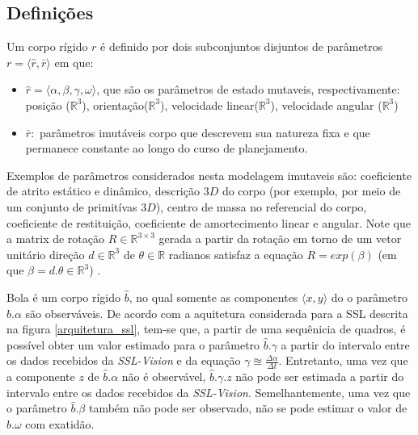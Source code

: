 \subsection{Definições}


\begin{defi}
  Um corpo rígido $r$ é definido por dois subconjuntos disjuntos
  de parâmetros $r= \langle \hat{r}, \bar{r} \rangle$ em que:
  \begin{itemize}
    \item $\hat{r} = \langle \alpha, \beta, \gamma, \omega \rangle$,
    que são os parâmetros de estado mutaveis, respectivamente:
    posição ($\mathbb{R} ^{3}$), orientação($\mathbb{R} ^{3}$),
    velocidade linear($\mathbb{R} ^{3}$), velocidade angular
    ($\mathbb{R} ^{3}$)

    \item $\bar{r} :$ parâmetros imutáveis corpo que descrevem sua
    natureza fixa e que permanece constante ao longo do curso de 
    planejamento.
  \end{itemize}

  Exemplos de parâmetros considerados nesta modelagem imutaveis são:
  coeficiente de atrito estático e dinâmico, descrição $3D$ do corpo
  (por exemplo, por meio de um conjunto de primitívas $3D$), centro de
  massa no referencial do corpo, coeficiente de restituição,
  coeficiente de amortecimento linear e angular. Note que a matrix de
  rotação $R\in\mathbb{R}^{3\times 3}$ gerada a partir da rotação
  em torno de um vetor unitário direção $d\in\mathbb{R}^{3}$  de
  $\theta \in \mathbb{R}$ radianos satisfaz a equação
  $R = exp\left( \beta \right)$ (em que $\beta = d. \theta \in \mathbb{R} ^{3}$)
  \cite{math2robotics}.
\end{defi}


\begin{defi}[Bola]\label{def:bola}
  Bola é um corpo rígido $\hat{b}$, no qual somente as componentes 
  $\langle x,y \rangle$ do o parâmetro $\hat{b}.\alpha$ são
  observáveis. De acordo com a
  aquitetura considerada para a SSL descrita na figura
  \ref{arquitetura_ssl}, tem-se que, a partir de uma sequênicia
  de quadros, é possível obter um valor estimado para o parâmetro
  $\hat{b}.\gamma$ a partir do intervalo entre os dados recebidos
  da \textit{SSL-Vision} e da equação $ \gamma \approxeq 
  \frac{\Delta \alpha}{\Delta t} $. Entretanto, uma vez que a componente
  $z$ de $\hat{b}.\alpha$ não é observável, $\hat{b}.\gamma.z$ 
  não pode ser estimada a partir do intervalo entre os dados recebidos
  da \textit{SSL-Vision}. Semelhantemente,  uma vez que o
  parâmetro $\hat{b}.\beta$ também não pode ser observado,
  não se pode estimar o valor de $\hat{b}.\omega$ com exatidão.
\end{defi}

